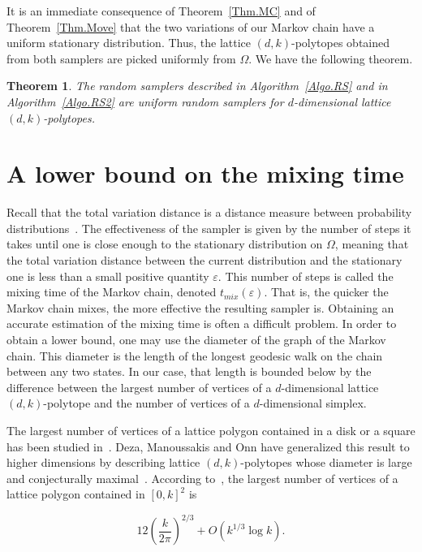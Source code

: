 \documentclass[a4paper,10pt]{article}
\newtheorem{theorem}{Theorem}
\begin{document}
It is an immediate consequence of Theorem~\ref{Thm.MC} and of Theorem~\ref{Thm.Move} that the two variations of our Markov chain have a uniform stationary distribution. Thus, the lattice $(d,k)$-polytopes obtained from both samplers are picked uniformly from $\Omega$. We have the following theorem.

\begin{theorem}\label{Thm.RS}
  The random samplers described in Algorithm~\ref{Algo.RS} and in Algorithm~\ref{Algo.RS2} are uniform random samplers for $d$-dimensional lattice $(d,k)$-polytopes.
\end{theorem}

\section{A lower bound on the mixing time}\label{Sec.Mix}

Recall that the total variation distance is a distance measure between probability distributions~\cite{levin2009markov}.
The effectiveness of the sampler is given by the number of steps it takes until one is close enough to the stationary distribution on $\Omega$, meaning that the total variation distance between the current distribution
and the stationary one is less than a small positive quantity $\varepsilon$. This number of steps is called the mixing time of the Markov chain, denoted $t_{mix}(\varepsilon)$. That is, the quicker the Markov chain mixes, the more effective the resulting sampler is. Obtaining an accurate estimation of the mixing time is often a difficult problem. In order to obtain a lower bound, one may use the diameter of the graph of the Markov chain. This diameter is the length of the longest geodesic walk on the chain between any two states.
In our case, that length is bounded below by the difference between the largest number of vertices of a $d$-dimensional lattice $(d,k)$-polytope and the number of vertices of a $d$-dimensional simplex.

The largest number of vertices of a lattice polygon contained in a disk or a square has been studied in~\cite{AcketaZunic1995,T91,BB91}. Deza, Manoussakis and Onn have generalized this result to higher dimensions by describing lattice $(d,k)$-polytopes whose diameter is large and conjecturally maximal~\cite{DezaManoussakisOnn2018}. According to~\cite{AcketaZunic1995}, the largest number of vertices of a lattice polygon contained in $[0,k]^2$ is

\begin{equation}\label{Eqn.Deza}
  12\left(\frac{k}{2\pi}\right)^{2/3}+O(k^{1/3}\log{k})\mbox{.}
\end{equation}
\end{document}
